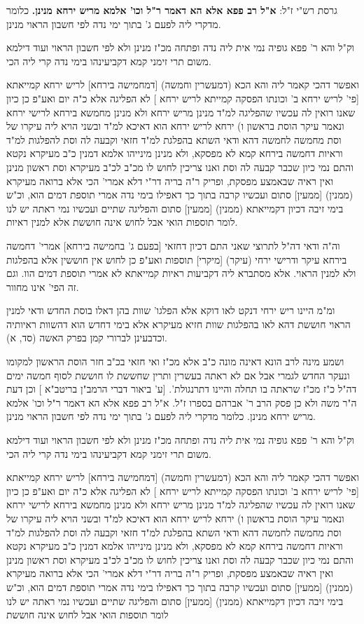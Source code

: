 \documentclass[12pt, openany]{book}
\begin{document}
{ גרסת רש"י ז"ל: \textbf{א"ל רב פפא אלא הא דאמר ר"ל וכו' אלמא מריש ירחא מנינן.} כלומר מדקרי ליה לפעם ג' בתוך ימי נדה לפי חשבון הראוי מנינן.\par וק"ל והא ר' פפא גופיה נמי אית ליה נדה ופתחה מכ"ז מנינן ולא לפי חשבון הראוי ועוד דילמא משום תרי זימני קמא דקביעינהו בימי נדה קרי ליה הכי.\par ואפשר דהכי קאמר ליה והא הכא (דמעשרין וחמשה) [דמחמישה בירחא] לריש ירחא קמייאתא [{\small פי' לריש ירחא ב' וכונתו הפסקה קמייתא לריש ירחא} ] לא הפליגה אלא כ"ה יום ואע"פ כן כיון שאנו רואין לה עכשיו שהפליגה למ"ד מנינן מריש ירחא ולא מנינן מחמשא בירחא לרישי ירחא ונאמר עיקר הוסת בראשון ו) ירחא לריש ירחא הוא דאיכא למ"ד ובשני הויא ליה עיקרו של וסת מחמשה לחמשה דהא ודאי השתא בהפלגת למ"ד חזאי וקבעה לה וסת להפלגות למ"ד וראיות דחמשה בירחא קמא לא מפסקא, ולא מנינן מינייהו אלמא דמנין כ"ב מעיקרא נקטא והתם נמי כיון שכבר קבעה לה וסת ואנו צריכין לחוש לו מכ"ב לכ"ב מעיקרא וסת ראשון מנינן ואין ראיה שבאמצע מפסקת, ופריק ר"ה בריה דר"י דלא אמרי' הכי אלא ברואה מעיקרא (ממנין) [ממעין] סתום ועכשיו קרבה בתוך כך דאפילו בימי נדה אמרי תוספת דמים הוא, וכ"ש בימי זיבה דכיון דקמייאתא (ממנין) [ממעין] סתום והפליגה שתיים ועכשיו נמי ראתה יש לנו לומר תוספות הואי אבל לחוש אינה חוששת אלא למנין ראיות.\par וה"ה ודאי דה"ל לתרוצי שאני התם דכיון דחזאי [בפעם ג' בחמישה בירחא] אמרי' דחמשה בירחא עיקר ודרישי ירחי (עיקר) [מיקרי] תוספות ואע"פ כן לחוש אין חוששין אלא בהפלגות ולא למנין הראוי. אלא מסתברא ליה דקביעות ראיות קמייאתא לא אמרי תוספת דמים הוו. וגם זה הפי' אינו מחוור.\par ומ"מ היינו ריש ירחי דנקט לאו דוקא אלא הפלגו' שוות בהן דאלו בוסת החדש ודאי למנין הראוי חוששת דהא לאו בהפלגות שוות חזיא מעיקרא אלא בימי דחדש הוא דהשוות ראיותיה וכדבעינן לברורי קמן בפרק האשה (סד, א).\par ושמע מינה לרב הונא דאינה מונה כ"ב אלא מכ"ז ואי חזאי בכ"ב חזר הוסת הראשון למקומו ונעקר החדש לגמרי אבל אם לא ראתה בעשרין ותרין שחששת לו חוששת לסוף חמשה ימים דה"ל כ"ז מכ"ז שראתה בו תחלה והיינו דתרנגולת'. [{\small ע' ביאור דברי הרמב"ן בריטב"א} ] וכן דעת ה"ר משה ולא כן פסק הרב ר' אברהם בספרו ז"ל. א"ל רב פפא אלא הא דאמר ר"ל וכו' אלמא מריש ירחא מנינן. כלומר מדקרי ליה לפעם ג' בתוך ימי נדה לפי חשבון הראוי מנינן.\par וק"ל והא ר' פפא גופיה נמי אית ליה נדה ופתחה מכ"ז מנינן ולא לפי חשבון הראוי ועוד דילמא משום תרי זימני קמא דקביעינהו בימי נדה קרי ליה הכי.\par ואפשר דהכי קאמר ליה והא הכא (דמעשרין וחמשה) [דמחמישה בירחא] לריש ירחא קמייאתא [{\small פי' לריש ירחא ב' וכונתו הפסקה קמייתא לריש ירחא} ] לא הפליגה אלא כ"ה יום ואע"פ כן כיון שאנו רואין לה עכשיו שהפליגה למ"ד מנינן מריש ירחא ולא מנינן מחמשא בירחא לרישי ירחא ונאמר עיקר הוסת בראשון ו) ירחא לריש ירחא הוא דאיכא למ"ד ובשני הויא ליה עיקרו של וסת מחמשה לחמשה דהא ודאי השתא בהפלגת למ"ד חזאי וקבעה לה וסת להפלגות למ"ד וראיות דחמשה בירחא קמא לא מפסקא, ולא מנינן מינייהו אלמא דמנין כ"ב מעיקרא נקטא והתם נמי כיון שכבר קבעה לה וסת ואנו צריכין לחוש לו מכ"ב לכ"ב מעיקרא וסת ראשון מנינן ואין ראיה שבאמצע מפסקת, ופריק ר"ה בריה דר"י דלא אמרי' הכי אלא ברואה מעיקרא (ממנין) [ממעין] סתום ועכשיו קרבה בתוך כך דאפילו בימי נדה אמרי תוספת דמים הוא, וכ"ש בימי זיבה דכיון דקמייאתא (ממנין) [ממעין] סתום והפליגה שתיים ועכשיו נמי ראתה יש לנו לומר תוספות הואי אבל לחוש אינה חוששת }
\end{document}
